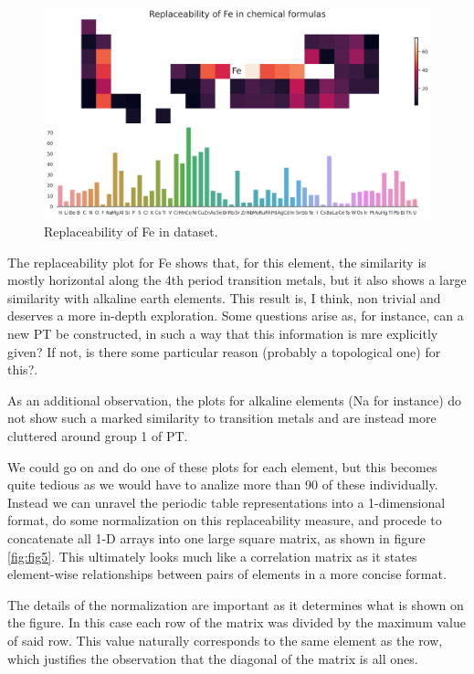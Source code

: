 \documentclass[]{article}
\begin{document}
\begin{figure}[h!]
  \centering
	\includegraphics[width=13.0cm]{replace_Fe.png}
	\caption{Replaceability of Fe in dataset.}
	\label{fig:fig4}
\end{figure}

The replaceability plot for Fe shows that, for this element, the similarity is mostly horizontal along the 4th period transition metals, but it also shows a large similarity with alkaline earth elements. This result is, I think, non trivial and deserves a more in-depth exploration. Some questions arise as, for instance, can a new PT be constructed, in such a way that this information is mre explicitly given? If not, is there some particular reason (probably a topological one) for this?.

As an additional observation, the plots for alkaline elements (Na for instance) do not show such a marked similarity to transition metals and are instead more cluttered around group 1 of PT.

We could go on and do one of these plots for each element, but this becomes quite tedious as we would have to analize more than 90 of these individually. Instead we can unravel the periodic table representations into a 1-dimensional format, do some normalization on this replaceability measure, and procede to concatenate all 1-D arrays into one large square matrix, as shown in figure \ref{fig:fig5}. This ultimately looks much like a correlation matrix as it states element-wise relationships between pairs of elements in a more concise format.

The details of the normalization are important as it determines what is shown on the figure. In this case each row of the matrix was divided by the maximum value of said row. This value naturally corresponds to the same element as the row, which justifies the observation that the diagonal of the matrix is all ones.
\end{document}
